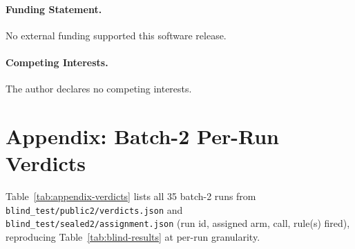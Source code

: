\documentclass[11pt]{article}
\begin{document}
\paragraph{Funding Statement.}
No external funding supported this software release.

\paragraph{Competing Interests.}
The author declares no competing interests.

\section*{Appendix: Batch-2 Per-Run Verdicts}
\label{app:verdicts}

Table~\ref{tab:appendix-verdicts} lists all 35 batch-2 runs from
\nolinkurl{blind_test/public2/verdicts.json} and
\nolinkurl{blind_test/sealed2/assignment.json} (run id, assigned arm, call,
rule(s) fired), reproducing Table~\ref{tab:blind-results} at per-run
granularity.
\end{document}
